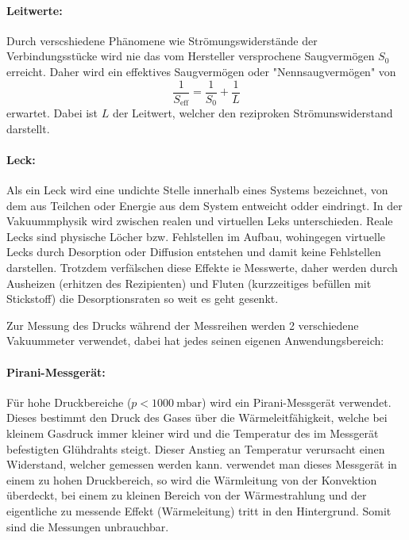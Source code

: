  \paragraph{Leitwerte:}
 Durch verscshiedene Phänomene wie Strömungswiderstände der Verbindungsstücke wird nie das vom Hersteller versprochene Saugvermögen $S_0$ erreicht.
 Daher wird ein effektives Saugvermögen oder "Nennsaugvermögen" von
 \begin{equation}
   \frac{1}{S_\text{eff}} = \frac{1}{S_0} + \frac{1}{L}
   \label{eqn:effSaug}
 \end{equation}
 erwartet. Dabei ist $L$ der Leitwert, welcher den reziproken Strömunswiderstand darstellt.

 \paragraph{Leck:}
 Als ein Leck wird eine undichte Stelle innerhalb eines Systems bezeichnet, von dem aus Teilchen oder Energie aus dem System
 entweicht odder eindringt.
 In der Vakuummphysik wird zwischen realen und virtuellen Leks unterschieden. Reale Lecks sind physische Löcher bzw. Fehlstellen
 im Aufbau, wohingegen virtuelle Lecks durch Desorption oder Diffusion entstehen und damit keine Fehlstellen darstellen.
 Trotzdem verfälschen diese Effekte ie Messwerte, daher werden durch Ausheizen (erhitzen des Rezipienten) und Fluten (kurzzeitiges
 befüllen mit Stickstoff) die Desorptionsraten so weit es geht gesenkt.

 Zur Messung des Drucks während der Messreihen werden 2 verschiedene Vakuummeter verwendet, dabei hat jedes seinen eigenen Anwendungsbereich:

 \paragraph{Pirani-Messgerät:}
 Für hohe Druckbereiche ($p < \SI{1000}{\milli\bar}$) wird ein Pirani-Messgerät verwendet. Dieses bestimmt den Druck des Gases über die Wärmeleitfähigkeit, welche
 bei kleinem Gasdruck immer kleiner wird und die Temperatur des im Messgerät befestigten Glühdrahts steigt. Dieser Anstieg an Temperatur verursacht einen Widerstand,
 welcher gemessen werden kann. verwendet man dieses Messgerät in einem zu hohen Druckbereich, so wird die Wärmleitung von der Konvektion überdeckt, bei einem zu kleinen
 Bereich von der Wärmestrahlung und der eigentliche zu messende Effekt (Wärmeleitung) tritt in den Hintergrund. Somit sind die Messungen unbrauchbar.

